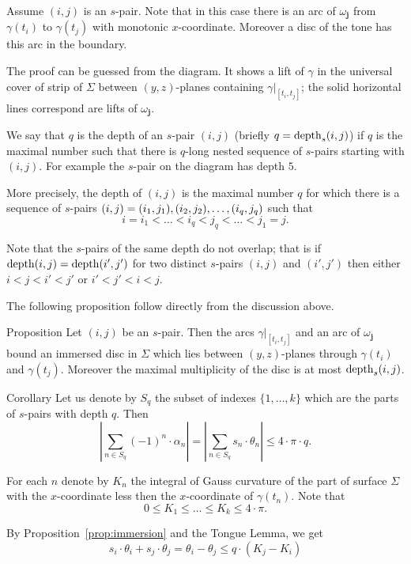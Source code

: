 \documentclass[a4paper,10pt]{article}
\begin{document}
Assume $(i,j)$ is an $s$-pair.
Note that in this case there is an arc of $\omega_{\bm{j}}$
from $\gamma(t_i)$ to $\gamma(t_j)$
with monotonic $x$-coordinate.
Moreover a disc of the tone has this arc in the boundary.

The proof can be guessed from the diagram.
It shows a lift of $\gamma$ in the universal cover of strip of $\Sigma$ between $(y,z)$-planes containing $\gamma|_{[t_i,t_j]}$;
the solid horizontal lines correspond are lifts of $\omega_{\bm{j}}$.

We say that $q$ is the depth of an $s$-pair $(i,j)$
(briefly $q=\mathop{\rm depth}\nolimits_{s}(i,j)$) 
if $q$ is the maximal number such that there is $q$-long nested sequence of $s$-pairs starting with $(i,j)$.
For example the $s$-pair on the diagram has depth $5$.

More precisely, the depth of $(i,j)$ is the maximal number $q$
for which there is a sequence of $s$-pairs
$(i,j)=(i_1,j_1),(i_2,j_2),\zz\dots,(i_q,j_q)$ such that
\[i=i_1<\dots<i_q<j_q<\dots<j_1=j.\]


Note that the $s$-pairs of the same depth do not overlap;
that is if  $\mathop{\rm depth}\nolimits(i,j)=\mathop{\rm depth}\nolimits(i',j')$
for two distinct $s$-pairs $(i,j)$ and $(i',j')$
then either $i<j<i'<j'$ or $i'<j'<i<j$.

The following proposition follow directly from the discussion above.

\begin{thm}{Proposition}\label{prop:immersion}
Let $(i,j)$ be an $s$-pair.
Then the arcs $\gamma|_{[t_i,t_j]}$ and an arc of $\omega_{\bm{j}}$ bound an immersed disc in $\Sigma$ which lies between $(y,z)$-planes through $\gamma(t_i)$ and $\gamma(t_j)$.
Moreover the maximal multiplicity of the disc is at most $\mathop{\rm depth}\nolimits_{s}(i,j)$.
\end{thm}


\begin{thm}{Corollary}\label{cor:Sq}
Let us denote by $S_q$  the subset of indexes $\{1,\dots,k\}$
which are the parts of $s$-pairs with depth $q$.
Then
\[\left|\sum_{n\in S_q}(-1)^n\cdot\alpha_n\right|
=\left|\sum_{n\in S_q}s_n\cdot\theta_n\right|
\le 4\cdot\pi\cdot q.\]
\end{thm}

 For each $n$ denote by $K_n$ the integral of Gauss curvature of the part of surface $\Sigma$ with the $x$-coordinate less then the $x$-coordinate of $\gamma(t_n)$.
Note that 
\[0\le K_1\le\dots\le K_k\le 4\cdot\pi.\]


By Proposition~\ref{prop:immersion} and the Tongue Lemma,
we get
\[s_i\cdot\theta_i+s_j\cdot\theta_j=\theta_i-\theta_j\le q\cdot (K_j-K_i)\]
\end{document}
